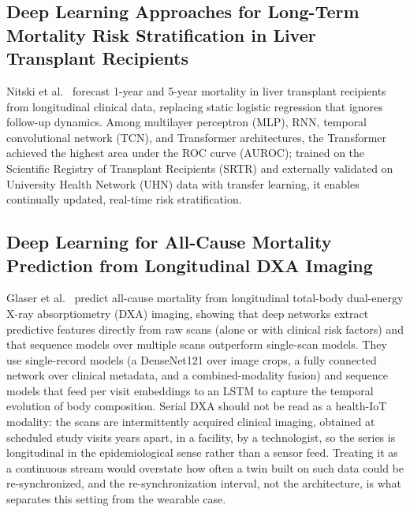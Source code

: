 \documentclass[journal]{IEEEtran}
\begin{document}
\subsection{Deep Learning Approaches for Long-Term Mortality Risk Stratification in Liver Transplant Recipients}

Nitski et al.~\cite{nitski2021long} forecast 1-year and 5-year mortality in liver transplant recipients from longitudinal clinical data, replacing static logistic regression that ignores follow-up dynamics. Among multilayer perceptron (MLP), RNN, temporal convolutional network (TCN), and Transformer architectures, the Transformer achieved the highest area under the ROC curve (AUROC); trained on the Scientific Registry of Transplant Recipients (SRTR) and externally validated on University Health Network (UHN) data with transfer learning, it enables continually updated, real-time risk stratification.


\subsection{Deep Learning for All-Cause Mortality Prediction from Longitudinal DXA Imaging}

Glaser et al.~\cite{glaser2022deep} predict all-cause mortality from longitudinal total-body dual-energy X-ray absorptiometry (DXA) imaging, showing that deep networks extract predictive features directly from raw scans (alone or with clinical risk factors) and that sequence models over multiple scans outperform single-scan models. They use single-record models (a DenseNet121 over image crops, a fully connected network over clinical metadata, and a combined-modality fusion) and sequence models that feed per visit embeddings to an LSTM to capture the temporal evolution of body composition. Serial DXA should not be read as a health-IoT modality: the scans are intermittently acquired clinical imaging, obtained at scheduled study visits years apart, in a facility, by a technologist, so the series is longitudinal in the epidemiological sense rather than a sensor feed. Treating it as a continuous stream would overstate how often a twin built on such data could be re-synchronized, and the re-synchronization interval, not the architecture, is what separates this setting from the wearable case.


\fi
\end{document}
